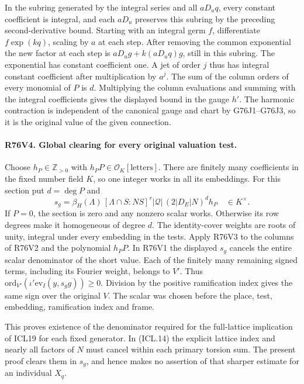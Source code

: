 In the subring generated by the integral series and all
$aD_uq$, every constant coefficient is integral, and each
$aD_u$ preserves this subring by the preceding second-derivative
bound. Starting with an integral germ $f$, differentiate
$f\exp(kq)$, scaling by $a$ at each step. After removing the
common exponential the new factor at each step is
$aD_u g+k(aD_u q)g$, still in this subring. The exponential
has constant coefficient one. A jet of order $j$ thus has
integral constant coefficient after multiplication by $a^j$.
The sum of the column orders of every monomial of $P$ is $d$.
Multiplying the column evaluations and summing with the integral
coefficients gives the displayed bound in the gauge $h'$. The
harmonic contraction is independent of the canonical gauge
and chart by G76J1--G76J3, so it is the original value of the
given connection.

\paragraph{R76V4. Global clearing for every original valuation test.}
Choose $h_P\in\mathbb Z_{>0}$ with
$h_PP\in\mathcal O_K[\text{letters}]$. There are finitely
many coefficients in the fixed number field $K$, so one integer
works in all its embeddings. For this section put $d=\deg P$ and
\[
 s_g=\beta_H(\Lambda)\,[\Lambda\cap S:NS]^r
       |\mathcal Q|\,(2|D_E|N)^d h_P \quad\in K^\times .
\]
If $P=0$, the section is zero and any nonzero scalar works.
Otherwise its row degrees make it homogeneous of degree $d$.
The identity-cover weights are roots of unity, integral under
every embedding in the tests. Apply R76V3 to the columns of
R76V2 and the polynomial $h_PP$. In R76V1 the displayed $s_g$
cancels the entire scalar denominator of the short value.
Each of the finitely many remaining signed terms, including
its Fourier weight, belongs to $V'$. Thus
$\mathrm{ord}_{V'}(\iota'\mathrm{ev}_I(y,s_gg))\geq0$.
Division by the positive ramification index gives the same sign
over the original $V$. The scalar was chosen before the place,
test, embedding, ramification index and frame.

This proves existence of the denominator required for the
full-lattice implication of ICL19 for each fixed generator.
In (ICL.14) the explicit lattice index and nearly all factors
of $N$ must cancel within each primary torsion sum. The present
proof clears them in $s_g$, and hence makes no assertion of
that sharper estimate for an individual $X_q$.
